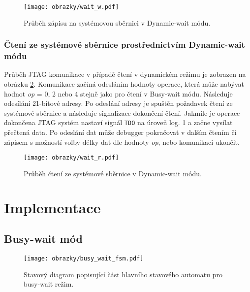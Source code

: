 \begin{figure}[!h]
  \begin{center}
    \texttt{[image: obrazky/wait\_w.pdf]}
  \end{center}
  \caption{Průběh zápisu na systémovou sběrnici v Dynamic-wait módu.}
	\label{fig:wait_w}
\end{figure}

\subsubsection{Čtení ze systémové sběrnice prostřednictvím Dynamic-wait módu}
Průběh JTAG komunikace v případě čtení v dynamickém režimu je zobrazen na obrázku \ref{fig:wait_r}. Komunikace začíná odesláním hodnoty operace, která může nabývat hodnot \textit{op} = 0, 2 nebo 4 stejně jako pro čtení v Busy-wait módu. Následuje odesílání 21-bitové adresy. Po odeslání adresy je spuštěn požadavek čtení ze systémové sběrnice a následuje signalizace dokončení čtení. Jakmile je operace dokončena \acs{JTAG} systém nastaví signál \texttt{\acs{TDO}} na úroveň log. 1 a začne vysílat přečtená data. Po odeslání dat může debugger pokračovat v dalším čtením či zápisem s možností volby délky dat dle hodnoty \textit{op}, nebo komunikaci ukončit. 

\begin{figure}[!h]
  \begin{center}
    \texttt{[image: obrazky/wait\_r.pdf]}
  \end{center}
  \caption{Průběh čtení ze systémové sběrnice v Dynamic-wait módu.}
	\label{fig:wait_r}
\end{figure}

\section{Implementace}

\subsection{Busy-wait mód} 

\begin{figure}[!h]
  \begin{center}
    \texttt{[image: obrazky/busy\_wait\_fsm.pdf]}
  \end{center}
  \caption{Stavový diagram popisující část hlavního stavového automatu pro busy-wait režim.}
	\label{fig:busy_wait_fsm}
\end{figure}